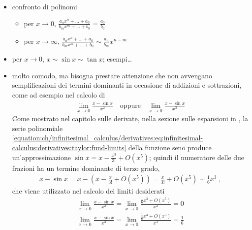 \documentclass[letterpaper,10pt,italian]{jupyterBook}
\begin{document}
\begin{itemize}
\item {} 
\sphinxAtStartPar
confronto di polinomi
\begin{itemize}
\item {} 
\sphinxAtStartPar
per \(x \rightarrow 0\), \(\frac{a_n x^n + \dots + a_0}{b_m x^m + \dots + b_0} = \frac{a_0}{b_0}\)

\item {} 
\sphinxAtStartPar
per \(x \rightarrow \infty\), \(\frac{a_n x^n + \dots + a_0}{b_m x^m + \dots + b_0} \sim \frac{a_n}{b_m} x^{n-m}\)

\end{itemize}

\item {} 
\sphinxAtStartPar
per \(x \rightarrow 0\), \(x \sim \sin x \sim \tan x\); esempi…

\item {} 
\sphinxAtStartPar
molto comodo, ma bisogna prestare attenzione che non avvengano semplificazioni dei termini dominanti in occasione di addizioni e sottrazioni, come ad esempio nel calcolo di
\begin{equation*}
\begin{split}\lim_{x \rightarrow 0} \frac{x - \sin x}{x^2} \quad \text{oppure} \quad \lim_{x \rightarrow 0} \frac{x - \sin x}{x^3} \end{split}
\end{equation*}
\sphinxAtStartPar
Come mostrato nel capitolo sulle derivate, nella sezione sulle espansioni in {\hyperref[\detokenize{ch/infinitesimal_calculus/derivatives:infinitesimal-calculus-derivatives-taylor}]{}}, la serie polinomiale \eqref{equation:ch/infinitesimal_calculus/derivatives:eq:infinitesimal-calculus:derivatives:taylor:fund-limits} della funzione seno produce un’approssimazione \(\sin x = x - \frac{x^3}{3!} + O(x^5)\); quindi il numeratore delle due frazioni ha un termine dominante di terzo grado,
\begin{equation*}
\begin{split}x - \sin x = x - \left( x - \frac{x}{3!} + O(x^5) \right) = \frac{x}{3!} + O(x^5) \sim \frac{1}{6} x^3 \ ,\end{split}
\end{equation*}
\sphinxAtStartPar
che viene utilizzato nel calcolo dei limiti desiderati
\begin{equation*}
\begin{split}\lim_{x \rightarrow 0} \frac{x - \sin x}{x^2} = \lim_{x \rightarrow 0} \frac{\frac{1}{6} x^3 + O(x^5)}{x^2} = 0 \end{split}
\end{equation*}\begin{equation*}
\begin{split}\lim_{x \rightarrow 0} \frac{x - \sin x}{x^3} = \lim_{x \rightarrow 0} \frac{\frac{1}{6} x^3 + O(x^5)}{x^3} = \frac{1}{6} \end{split}
\end{equation*}
\end{itemize}
\end{document}
